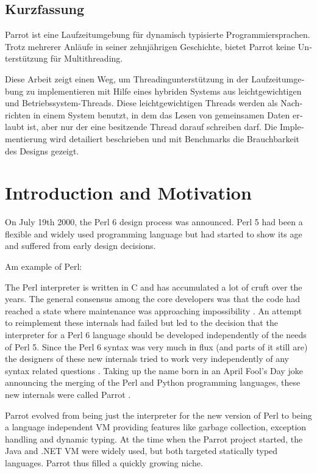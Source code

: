 \documentclass[bachelor,english]{hgbthesis}
\begin{document}
\begin{german}
\chapter{Kurzfassung}

Parrot ist eine Laufzeitumgebung f{\"u}r dynamisch typisierte Programmiersprachen. Trotz mehrerer Anl{\"a}ufe in seiner zehnj{\"a}hrigen Geschichte, bietet Parrot keine Unterst{\"u}tzung f{\"u}r Multithreading.

Diese Arbeit zeigt einen Weg, um Threadingunterst{\"u}tzung in der Laufzeitumgebung zu implementieren mit Hilfe eines hybriden Systems aus leichtgewichtigen und Betriebssystem-Threads. Diese leichtgewichtigen Threads werden als Nachrichten in einem System benutzt, in dem das Lesen von gemeinsamen Daten erlaubt ist, aber nur der eine besitzende Thread darauf schreiben darf. Die Implementierung wird detailiert beschrieben und mit Benchmarks die Brauchbarkeit des Designs gezeigt.

\end{german}

\mainmatter

\chapter{Introduction and Motivation}

%
On July 19th 2000, the Perl 6 design process was announced. Perl 5 had been a flexible and widely used programming language but had started to show its age and suffered from early design decisions.

Am example of Perl:


The Perl interpreter is written in C and has accumulated a lot of cruft over the years. The general consensus among the core developers was that the code had reached a state where maintenance was approaching impossibility \cite{Masak40451}. An attempt to reimplement these internals had failed but led to the decision that the interpreter for a Perl 6 language should be developed independently of the needs of Perl 5. Since the Perl 6 syntax was very much in flux (and parts of it still are) the designers of these new internals tried to work very independently of any syntax related questions \cite{Developer}. Taking up the name born in an April Fool's Day joke announcing the merging of the Perl and Python programming languages, these new internals were called Parrot \cite{Perl}.

Parrot evolved from being just the interpreter for the new version of Perl to being a language independent VM providing features like garbage collection, exception handling and dynamic typing. At the time when the Parrot project started, the Java and .NET VM were widely used, but both targeted statically typed languages. Parrot thus filled a quickly growing niche.
\end{document}
